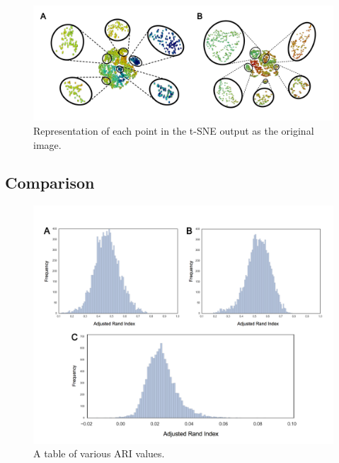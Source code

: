 \documentclass[12pt,oneside,onecolumn,a4paper]{article}
\begin{document}
\begin{figure}[H]
\begin{center}
\includegraphics[width=\columnwidth]{figures/image_cluster}
\caption{Representation of each point in the t-SNE output as the original image. \label{fig:image_scatter}%
}
\end{center}
\end{figure}

\subsection{Comparison}

\begin{figure}[H]
\begin{center}
\includegraphics[width=\columnwidth]{figures/ari_dist}
\caption{A table of various ARI values. \label{fig:ARI_table}%
}
\end{center}
\end{figure}
\end{document}

